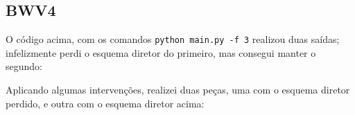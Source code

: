 \subsection{BWV4}

O código acima, com os comandos \verb|python main.py -f 3| realizou duas saídas; infelizmente perdi o esquema diretor do primeiro, mas consegui manter o segundo:



Aplicando algumas intervenções, realizei duas peças, uma com o esquema diretor perdido, e outra com o esquema diretor acima:




